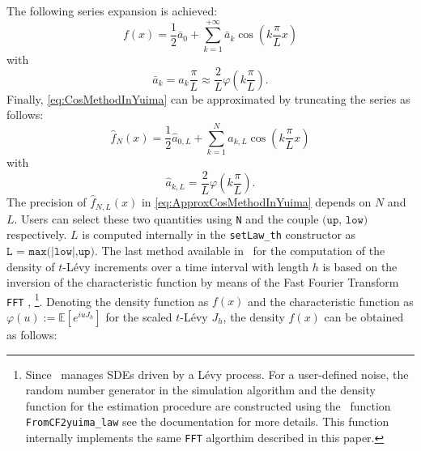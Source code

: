 The following series expansion is achieved:
\begin{equation}
f\left(x\right)=\frac12 \bar{a}_0 + \sum_{k=1}^{+\infty} \bar{a}_k\cos\left(k\frac{\pi}{L}x\right)
\label{eq:CosMethodInYuima}
\end{equation}
with
\[
\bar{a}_k = a_k \frac{\pi}{L} \approx \frac{2}{L}\varphi\left(k\frac{\pi}{L}\right).
\]
Finally, \eqref{eq:CosMethodInYuima} can be approximated by truncating the series as follows:
\begin{equation}
\hat{f}_{N}\left(x\right)=\frac12 \hat{a}_{0,L} + \sum_{k=1}^{N} \hat{a}_{k,L}\cos\left(k\frac{\pi}{L}x\right)
\label{eq:ApproxCosMethodInYuima}
\end{equation}
with
\[
\hat{a}_{k,L}=\frac{2}{L}\varphi\left(k\frac{\pi}{L}\right).
\]
The precision of \(\hat{f}_{N,L}\left(x\right)\) in \eqref{eq:ApproxCosMethodInYuima} depends on \(N\) and \(L\). Users can select these two quantities using \texttt{N} and the couple \(\texttt{(up, low)}\) respectively. \(L\) is computed internally in the \texttt{setLaw\_th} constructor as \(\texttt{L = max(|low|,up)}\).
The last method available in  ~for the computation of the density of \(t\)-Lévy increments over a time interval with length \(h\) is based on the inversion of the characteristic function by means of the Fast Fourier Transform \texttt{FFT} \citet{singleton1969algorithm}, \citet{cooley1965algorithm} \footnote{Since  ~manages SDEs driven by a Lévy process. For a user-defined noise, the random number generator in the simulation algorithm and the density function for the estimation procedure are constructed using the  ~function \texttt{FromCF2yuima\_law} see the documentation \citet{YUIMA} for more details. This function internally implements the same \texttt{FFT} algorthim described in this paper.}. Denoting the density function as \(f\left(x\right)\) and the characteristic function as \(\varphi\left(u\right):=\mathbb{E}\left[e^{iu J_h}\right]\) for the scaled \(t\)-Lévy \(J_h\), the density \(f\left(x\right)\) can be obtained as follows:

